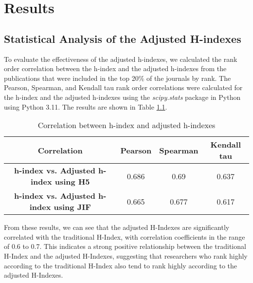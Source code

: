 \chapter{Results}
\label{ch:results}

\section{Statistical Analysis of the Adjusted H-indexes}

To evaluate the effectiveness of the adjusted h-indexes, we calculated the rank
order correlation between the h-index and the adjusted h-indexes from the
publications that were included in the top 20\% of the journals by rank. The
Pearson, Spearman, and Kendall tau rank order correlations were calculated for
the h-index and the adjusted h-indexes using the \emph{scipy.stats} package in
Python using Python 3.11. The results are shown in Table
\ref{tab:correlations}.

\begin{table}[H]
    \centering
    \begin{tabular}{|c|c|c|c|}
        \hline
        \textbf{Correlation}                            & \textbf{Pearson} & \textbf{Spearman} & \textbf{Kendall tau} \\ \hline
        \textbf{h-index vs. Adjusted h-index using H5}  & 0.686            & 0.69              & 0.637                \\ \hline
        \textbf{h-index vs. Adjusted h-index using JIF} & 0.665            & 0.677             & 0.617                \\ \hline
    \end{tabular}
    \caption{Correlation between h-index and adjusted h-indexes}
    \label{tab:correlations}
\end{table}


From these results, we can see that the adjusted H-Indexes are significantly
correlated with the traditional H-Index, with correlation coefficients in the
range of 0.6 to 0.7. This indicates a strong positive relationship between the
traditional H-Index and the adjusted H-Indexes, suggesting that researchers who
rank highly according to the traditional H-Index also tend to rank highly
according to the adjusted H-Indexes.

